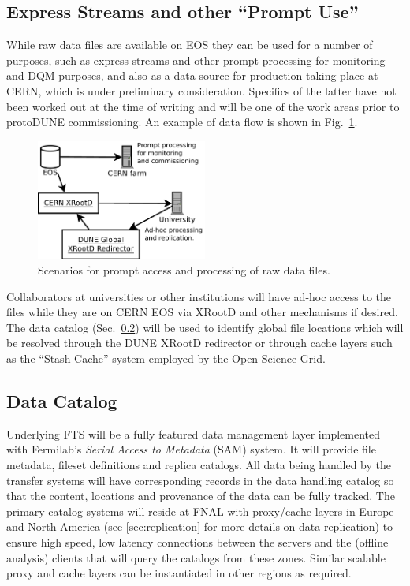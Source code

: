 \documentclass[12pt]{article}
\newcommand{\pd}{protoDUNE\xspace}
\begin{document}
\subsection{Express Streams and other ``Prompt Use''}
\label{sec:prompt}

While raw data files are available on EOS they can be
used for a number of purposes, such as express streams and
other prompt processing for monitoring and DQM purposes,
and also as a data source for production taking place at CERN, which is under preliminary
consideration. Specifics of the latter have not been  worked out at the time of writing
and will be one of the work areas prior to \pd commissioning.
An example of data flow is shown in Fig.~\ref{fig:prompt}.

\begin{figure}[tbh]
  \centering
  \includegraphics[width=0.5\textwidth]{figures/prompt.pdf}
  \caption{Scenarios for prompt access and processing of raw data files.}
  \label{fig:prompt}
\end{figure}


\noindent Collaborators at universities or other institutions will have ad-hoc
access to the files while they are on CERN EOS via XRootD and other mechanisms if desired. 
The data catalog (Sec.~\ref{sec:sam}) will be used to identify global file
locations which will be resolved through the DUNE XRootD redirector or
through cache layers such as the ``Stash Cache'' system employed by
the Open Science Grid.

\subsection{Data Catalog}
\label{sec:sam}

Underlying FTS will be a fully featured data management layer
implemented with Fermilab's \textit{Serial Access to Metadata} (SAM) system.
It will provide file metadata, fileset definitions and replica
catalogs.  All data being handled by the transfer systems will have
corresponding records in the data handling catalog so that the
content, locations and provenance of the data can be fully tracked.
The primary catalog systems will reside at FNAL with proxy/cache
layers in Europe and North America (see \ref{sec:replication}
for more details on data replication) to ensure high speed,
low latency connections between the servers and the (offline analysis)
clients that will query the catalogs from these zones.  Similar
scalable proxy and cache layers can be instantiated in other regions as required.
\end{document}
